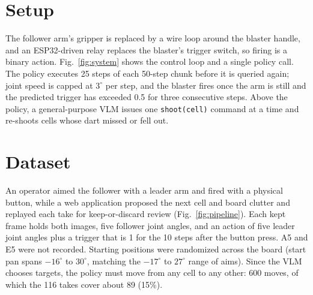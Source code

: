 \documentclass[10pt,letterpaper]{article}
\begin{document}
\section{Setup}


The follower arm's gripper is replaced by a wire loop around the blaster handle, and an ESP32-driven relay replaces the blaster's trigger switch, so firing is a binary action. Fig.~\ref{fig:system} shows the control loop and a single policy call. The policy executes 25 steps of each 50-step chunk before it is queried again; joint speed is capped at $3^\circ$ per step, and the blaster fires once the arm is still and the predicted trigger has exceeded 0.5 for three consecutive steps. Above the policy, a general-purpose VLM issues one \texttt{shoot(cell)} command at a time and re-shoots cells whose dart missed or fell out.

\section{Dataset}

An operator aimed the follower with a leader arm and fired with a physical button, while a web application proposed the next cell and board clutter and replayed each take for keep-or-discard review (Fig.~\ref{fig:pipeline}). Each kept frame holds both images, five follower joint angles, and an action of five leader joint angles plus a trigger that is 1 for the 10 steps after the button press. A5 and E5 were not recorded. Starting positions were randomized across the board (start pan spans $-16^\circ$ to $30^\circ$, matching the $-17^\circ$ to $27^\circ$ range of aims). Since the VLM chooses targets, the policy must move from any cell to any other: 600 moves, of which the 116 takes cover about 89 (15\%).
\end{document}

